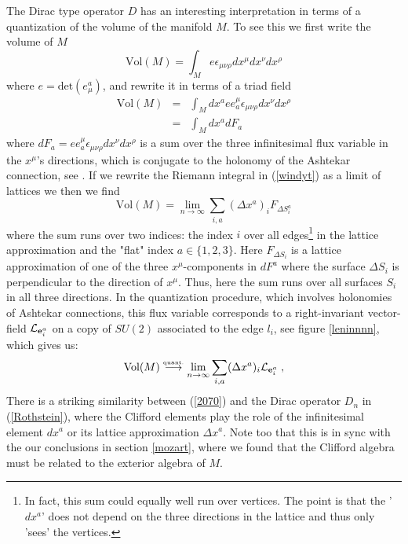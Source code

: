 \documentclass[12pt]{article}
\newcommand{\nn}{\nonumber}
\def\e{\epsilon}
\def\m{\mu}
\def\n{\nu}
\def\r{\rho}
\def\cl{{\cal L}}
\begin{document}
The Dirac type operator $D$ has an interesting interpretation in terms of a quantization of the volume of the manifold $M$. To see this we first write the volume of $M$
$$
\mbox{Vol}(M) = \int_M e \e_{\m\n\r} dx^\m dx^\n dx^\r
$$
where $e=\mbox{det}(e_\m^a)$, and rewrite it in terms of a triad field
\begin{eqnarray}
\mbox{Vol}(M) &=& \int_M dx^a   e e^\m_a   \e_{\m\n\r}  dx^\n dx^\r
\nn\\
&=&  \int_M dx^a   dF_a
\label{windyt}
\end{eqnarray}
where $dF_a= e e^\m_a   \e_{\m\n\r}  dx^\n dx^\r$ is a sum over the three infinitesimal flux variable in the $x^\m$'s directions, which is conjugate to the holonomy of the Ashtekar connection, see \cite{AL1}.
%
If we rewrite the Riemann integral in (\ref{windyt}) as a limit of lattices we then we find
\begin{equation}
\mbox{Vol}(M) = \lim_{n \rightarrow \infty} \sum_{i,a} (\Delta x^a)_i F_{\Delta S^a_i}
\nn%
\end{equation}
%
where the sum runs over two indices: the index $i$ over all edges\footnote{In fact, this sum could equally well run over vertices. The point is that the '$dx^a$' does not depend on the three directions in the lattice and thus only 'sees' the vertices.} in the lattice approximation and the "flat" index $a\in\{1,2,3\}$. Here $F_{\Delta S_i}$ is a lattice approximation of one of the three $x^\m$-components in $dF^a$ where the surface $\Delta S_i$ is perpendicular to the direction of $x^\m$. Thus, here the sum runs over all surfaces $S_i$ in all three directions. In the quantization procedure, which involves holonomies of Ashtekar connections, this flux variable corresponds to a right-invariant vector-field $\cl_{{\bf e}_i^a}$ on a copy of $SU(2)$ associated to the edge $l_i$, see figure \ref{leninnnn}, which gives us:
\begin{equation}
\mbox{Vol}(M)\stackrel{\mbox{\tiny quant.}}{\longrightarrow} \lim_{n \rightarrow \infty} \sum_{i,a} (\Delta x^a)_i \cl_{{\bf e}_i^a}\;,
\label{2070}
\end{equation}
There is a striking similarity between (\ref{2070}) and the Dirac operator $D_n$ in (\ref{Rothstein}), where the Clifford elements play the role of the infinitesimal element $dx^a$ or its lattice approximation $\Delta x^a$. Note too that this is in sync with the our conclusions in section \ref{mozart}, where we found that the Clifford algebra must be related to the exterior algebra of $M$.
\end{document}
